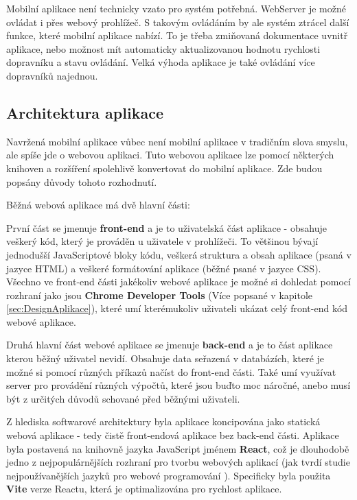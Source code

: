 Mobilní aplikace není technicky vzato pro systém potřebná. WebServer je možné ovládat i přes webový prohlížeč. S takovým ovládáním by ale systém ztrácel další funkce, které mobilní aplikace nabízí. To je třeba zmiňovaná dokumentace uvnitř aplikace, nebo možnost mít automaticky aktualizovanou hodnotu rychlosti dopravníku a stavu ovládání. Velká výhoda aplikace je také ovládání více dopravníků najednou.

\subsection{Architektura aplikace}

Navržená mobilní aplikace vůbec není mobilní aplikace v tradičním slova smyslu, ale spíše jde o webovou aplikaci. Tuto webovou aplikace lze pomocí některých knihoven a rozšíření spolehlivě konvertovat do mobilní aplikace. Zde budou popsány důvody tohoto rozhodnutí.

Běžná webová aplikace má dvě hlavní části:

První část se jmenuje \textbf{front-end} a je to uživatelská část aplikace - obsahuje veškerý kód, který je prováděn u uživatele v prohlížeči. To většinou bývají jednodušší JavaScriptové bloky kódu, veškerá struktura a obsah aplikace (psaná v jazyce HTML) a veškeré formátování aplikace (běžné psané v jazyce CSS). Všechno ve front-end části jakékoliv webové aplikace je možné si dohledat pomocí rozhraní jako jsou \textbf{Chrome Developer Tools} (Více popsané v kapitole \ref{sec:DesignAplikace}), které umí kterémukoliv uživateli ukázat celý front-end kód webové aplikace.

Druhá hlavní část webové aplikace se jmenuje \textbf{back-end} a je to část aplikace kterou běžný uživatel nevidí. Obsahuje data seřazená v databázích, které je možné si pomocí různých příkazů načíst do front-end části. Také umí využívat server pro provádění různých výpočtů, které jsou buďto moc náročné, anebo musí být z určitých důvodů schované před běžnými uživateli.

Z hlediska softwarové architektury byla aplikace koncipována jako statická webová aplikace - tedy čistě front-endová aplikace bez back-end části. Aplikace byla postavená na knihovně jazyka JavaScript jménem \textbf{React}, což je dlouhodobě jedno z nejpopulárnějších rozhraní pro tvorbu webových aplikací (jak tvrdí studie nejpoužívanějších jazyků pro webové programování \cite{ReactWebDeveloperPopularity}). Specificky byla použita \textbf{Vite} verze Reactu, která je optimalizována pro rychlost aplikace.
\cite{ViteReactWeb}


